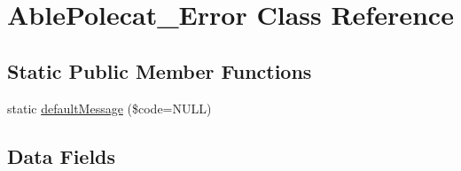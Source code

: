\hypertarget{class_able_polecat___error}{}\section{Able\+Polecat\+\_\+\+Error Class Reference}
\label{class_able_polecat___error}
\subsection*{Static Public Member Functions}
\begin{DoxyCompactItemize}
\item 
static \hyperlink{class_able_polecat___error_a7678a90bc9588b3f0dc91853b6f4566f}{default\+Message} (\$code=N\+U\+L\+L)
\end{DoxyCompactItemize}
\subsection*{Data Fields}
